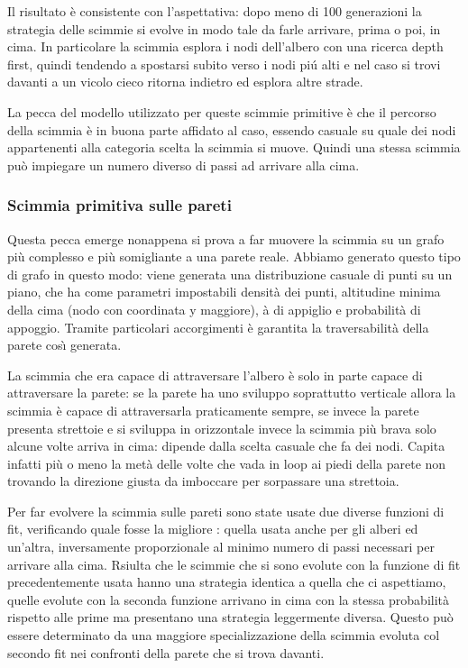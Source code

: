 \documentclass{article}
\begin{document}
Il risultato \`{e} consistente con l'aspettativa: dopo meno di 100 generazioni la strategia delle scimmie si evolve in modo tale da farle arrivare, prima o poi, in cima. In particolare la scimmia esplora i nodi dell'albero con una ricerca depth first, quindi tendendo a spostarsi subito verso i nodi pi\'{u} alti e nel caso si trovi davanti a un vicolo cieco ritorna indietro ed esplora altre strade.

La pecca del modello utilizzato per queste scimmie primitive \`{e} che il percorso della scimmia \`{e} in buona parte affidato al caso, essendo casuale su quale dei nodi appartenenti alla categoria scelta la scimmia si muove. Quindi una stessa scimmia pu\`{o} impiegare un numero diverso di passi ad arrivare alla cima.
\subsubsection{Scimmia primitiva sulle pareti}
Questa pecca emerge nonappena si prova a far muovere la scimmia su un grafo pi\`{u} complesso e pi\`{u} somigliante a una parete reale. Abbiamo generato questo tipo di grafo in questo modo: viene generata una distribuzione casuale di punti su un piano, che ha come parametri impostabili densit\`{a} dei punti, altitudine minima della cima (nodo con coordinata y maggiore), \`{a} di appiglio e probabilit\`{a} di appoggio. Tramite particolari accorgimenti \`{e} garantita la traversabilit\`{a} della parete cos\`{\i} generata. 

La scimmia che era capace di attraversare l'albero \`{e} solo in parte capace di attraversare la parete: se la parete ha uno sviluppo soprattutto verticale allora la scimmia \`{e} capace di attraversarla praticamente sempre, se invece la parete presenta strettoie e si sviluppa in orizzontale invece la scimmia pi\`{u} brava solo alcune volte arriva in cima: dipende dalla scelta casuale che fa dei nodi. Capita infatti pi\`{u} o meno la met\`{a} delle volte che vada in loop ai piedi della parete non trovando la direzione giusta da imboccare per sorpassare una strettoia.

Per far evolvere la scimmia sulle pareti sono state usate due diverse funzioni di fit, verificando quale fosse la migliore : quella usata anche per gli alberi ed un'altra, inversamente proporzionale al minimo numero di passi necessari per arrivare alla cima. Rsiulta che le scimmie che si sono evolute con la funzione di fit precedentemente usata hanno una strategia identica a quella che ci aspettiamo, quelle evolute con la seconda funzione arrivano in cima con la stessa probabilit\`{a} rispetto alle prime ma presentano una strategia leggermente diversa. Questo pu\`{o} essere determinato da una maggiore specializzazione della scimmia evoluta col secondo fit nei confronti della parete che si trova davanti.
\end{document}
